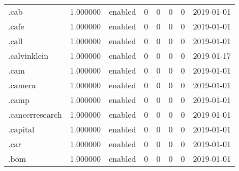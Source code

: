 \begin{tabular}{lrlrrrrl}
.cab                      &          1.000000 &         enabled &                           0 &                           0 &                           0 &                   0 &           2019-01-01 \\
.cafe                     &          1.000000 &         enabled &                           0 &                           0 &                           0 &                   0 &           2019-01-01 \\
.call                     &          1.000000 &         enabled &                           0 &                           0 &                           0 &                   0 &           2019-01-01 \\
.calvinklein              &          1.000000 &         enabled &                           0 &                           0 &                           0 &                   0 &           2019-01-17 \\
.cam                      &          1.000000 &         enabled &                           0 &                           0 &                           0 &                   0 &           2019-01-01 \\
.camera                   &          1.000000 &         enabled &                           0 &                           0 &                           0 &                   0 &           2019-01-01 \\
.camp                     &          1.000000 &         enabled &                           0 &                           0 &                           0 &                   0 &           2019-01-01 \\
.cancerresearch           &          1.000000 &         enabled &                           0 &                           0 &                           0 &                   0 &           2019-01-01 \\
.capital                  &          1.000000 &         enabled &                           0 &                           0 &                           0 &                   0 &           2019-01-01 \\
.car                      &          1.000000 &         enabled &                           0 &                           0 &                           0 &                   0 &           2019-01-01 \\
.bom                      &          1.000000 &         enabled &                           0 &                           0 &                           0 &                   0 &           2019-01-01 \\

\end{tabular}
